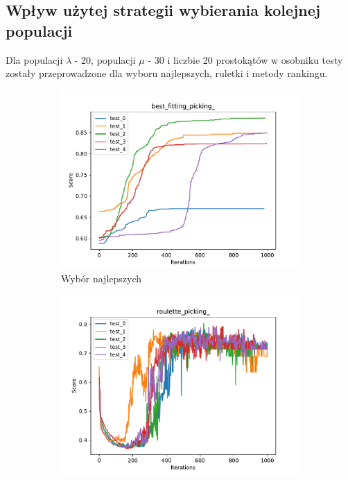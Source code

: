 \subsection*{Wpływ użytej strategii wybierania kolejnej populacji}
Dla populacji $\lambda$ - 20, populacji $\mu$ - 30 i liczbie 20 prostokątów w osobniku testy zostały przeprowadzone dla wyboru najlepszych, ruletki i metody rankingu.

\begin{figure}[h!]
    \centering 
    \begin{subfigure}[b]{0.49\linewidth}
        \includegraphics[width=\linewidth]{img/best_fitting_picking_.pdf}
        \caption{Wybór najlepszych}
    \end{subfigure}
    \begin{subfigure}[b]{0.49\linewidth}
        \includegraphics[width=\linewidth]{img/roulette_picking_.pdf}

\end{subfigure}
\end{figure}
